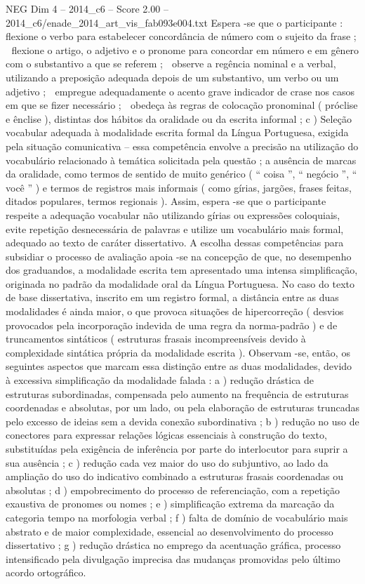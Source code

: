 \begin{textsample}{NEG Dim 4 – 2014\_c6 – Score 2.00 – 2014\_c6/enade\_2014\_art\_vis\_fab093e004.txt}
Espera -se que o participante :  flexione o verbo para estabelecer concordância de número com o sujeito da frase ;  flexione o artigo, o adjetivo e o pronome para concordar em número e em gênero com o substantivo a que se referem ;  observe a regência nominal e a verbal, utilizando a preposição adequada depois de um substantivo, um verbo ou um adjetivo ;  empregue adequadamente o acento grave indicador de crase nos casos em que se fizer necessário ;  obedeça às regras de colocação pronominal ( próclise e ênclise ), distintas dos hábitos da oralidade ou da escrita informal ; c ) Seleção vocabular adequada à modalidade escrita formal da Língua Portuguesa, exigida pela situação comunicativa – essa competência envolve a precisão na utilização do vocabulário relacionado à temática solicitada pela questão ; a ausência de marcas da oralidade, como termos de sentido de muito genérico ( “ coisa ”, “ negócio ”, “ você ” ) e termos de registros mais informais ( como gírias, jargões, frases feitas, ditados populares, termos regionais ).
Assim, espera -se que o participante respeite a adequação vocabular não utilizando gírias ou expressões coloquiais, evite repetição desnecessária de palavras e utilize um vocabulário mais formal, adequado ao texto de caráter dissertativo.
A escolha dessas competências para subsidiar o processo de avaliação apoia -se na concepção de que, no desempenho dos graduandos, a modalidade escrita tem apresentado uma intensa simplificação, originada no padrão da modalidade oral da Língua Portuguesa.
No caso do texto de base dissertativa, inscrito em um registro formal, a distância entre as duas modalidades é ainda maior, o que provoca situações de hipercorreção ( desvios provocados pela incorporação indevida de uma regra da norma-padrão ) e de truncamentos sintáticos ( estruturas frasais incompreensíveis devido à complexidade sintática própria da modalidade escrita ).
Observam -se, então, os seguintes aspectos que marcam essa distinção entre as duas modalidades, devido à excessiva simplificação da modalidade falada : a ) redução drástica de estruturas subordinadas, compensada pelo aumento na frequência de estruturas coordenadas e absolutas, por um lado, ou pela elaboração de estruturas truncadas pelo excesso de ideias sem a devida conexão subordinativa ; b ) redução no uso de conectores para expressar relações lógicas essenciais à construção do texto, substituídas pela exigência de inferência por parte do interlocutor para suprir a sua ausência ; c ) redução cada vez maior do uso do subjuntivo, ao lado da ampliação do uso do indicativo combinado a estruturas frasais coordenadas ou absolutas ; d ) empobrecimento do processo de referenciação, com a repetição exaustiva de pronomes ou nomes ; e ) simplificação extrema da marcação da categoria tempo na morfologia verbal ; f ) falta de domínio de vocabulário mais abstrato e de maior complexidade, essencial ao desenvolvimento do processo dissertativo ; g ) redução drástica no emprego da acentuação gráfica, processo intensificado pela divulgação imprecisa das mudanças promovidas pelo último acordo ortográfico.

\end{textsample}
